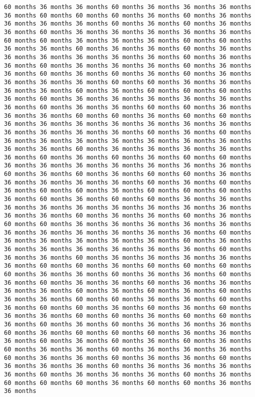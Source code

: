 \documentclass[11pt]{article}
\begin{document}
\begin{Verbatim}[commandchars=\\\{\}, frame=single, framerule=2mm, rulecolor=\color{outerrorbackground}]
60 months 36 months 36 months 60 months 36 months 36 months 36 months 36 months 60 months 60 months 60 months 36 months 60 months 36 months 36 months 36 months 36 months 60 months 36 months 60 months 36 months 36 months 60 months 36 months 36 months 36 months 36 months 36 months 60 months 60 months 36 months 36 months 36 months 60 months 60 months 36 months 36 months 60 months 36 months 36 months 60 months 36 months 36 months 36 months 36 months 36 months 36 months 60 months 36 months 36 months 60 months 36 months 36 months 36 months 60 months 36 months 36 months 60 months 36 months 60 months 36 months 60 months 36 months 36 months 36 months 36 months 60 months 60 months 36 months 36 months 36 months 36 months 60 months 36 months 60 months 60 months 60 months 36 months 60 months 36 months 36 months 36 months 36 months 36 months 36 months 60 months 36 months 36 months 60 months 60 months 36 months 36 months 36 months 60 months 60 months 36 months 60 months 60 months 36 months 36 months 36 months 36 months 36 months 36 months 36 months 36 months 36 months 36 months 36 months 60 months 36 months 60 months 36 months 36 months 36 months 36 months 36 months 36 months 36 months 36 months 36 months 60 months 36 months 36 months 36 months 36 months 36 months 60 months 36 months 60 months 36 months 60 months 60 months 36 months 36 months 36 months 36 months 36 months 36 months 36 months 60 months 36 months 60 months 36 months 60 months 60 months 36 months 36 months 36 months 36 months 36 months 60 months 36 months 60 months 36 months 60 months 60 months 36 months 60 months 60 months 60 months 36 months 60 months 36 months 60 months 60 months 36 months 36 months 36 months 36 months 36 months 36 months 36 months 36 months 36 months 36 months 36 months 60 months 36 months 36 months 60 months 36 months 60 months 60 months 36 months 36 months 36 months 36 months 36 months 36 months 36 months 36 months 36 months 36 months 36 months 60 months 36 months 36 months 36 months 36 months 36 months 60 months 36 months 36 months 36 months 36 months 36 months 36 months 36 months 60 months 36 months 36 months 60 months 36 months 36 months 36 months 36 months 36 months 60 months 60 months 36 months 60 months 60 months 60 months 60 months 36 months 36 months 60 months 36 months 36 months 60 months 36 months 60 months 36 months 36 months 60 months 36 months 36 months 36 months 36 months 60 months 36 months 60 months 36 months 60 months 36 months 36 months 60 months 60 months 36 months 36 months 60 months 36 months 60 months 60 months 36 months 60 months 36 months 60 months 36 months 36 months 60 months 60 months 36 months 60 months 60 months 36 months 60 months 36 months 60 months 36 months 36 months 36 months 60 months 36 months 60 months 60 months 60 months 36 months 36 months 36 months 60 months 36 months 60 months 36 months 60 months 36 months 60 months 36 months 36 months 60 months 36 months 36 months 36 months 60 months 36 months 36 months 60 months 36 months 36 months 60 months 36 months 36 months 36 months 60 months 36 months 36 months 36 months 36 months 60 months 36 months 36 months 36 months 60 months 36 months 60 months 60 months 60 months 36 months 60 months 60 months 36 months 36 months 
\end{Verbatim}
\end{document}
